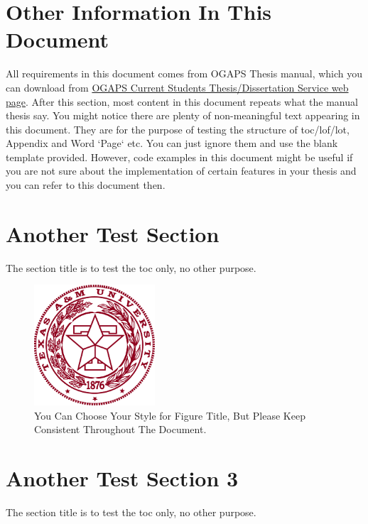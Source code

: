 \section{Other Information In This Document}
All requirements in this document comes from OGAPS Thesis manual, which you can download from \href{http://ogapstest.tamu.edu/New-Current-Students/Thesis-and-Dissertation-Services/Prepare-Your-Document/#0-ResourcesforPreparation}{OGAPS Current Students Thesis/Dissertation Service web page}. After this section, most content in this document repeats what the manual thesis say.  You might notice there are plenty of non-meaningful text appearing in this document. They are for the purpose of testing the structure of toc/lof/lot, Appendix and Word `Page` etc. You can just ignore them and use the blank template provided. However, code examples in this document might be useful if you are not sure about the implementation of certain features in your thesis and you can refer to this document then.
\section{Another Test Section}
The section title is to test the toc only, no other purpose.

 \begin{figure}[!hbp]
\begin{center}
\includegraphics[width=0.4\textwidth]{graphic/logoTAMU.jpg}
\caption[\protect\vspace{-2.8ex}{You Can Choose Your Style for Figure Title, But Please Keep Consistent Throughout The Document.}]{You Can Choose Your Style for Figure Title, But Please Keep Consistent Throughout The Document.}
\label{fig:testExample4}
\end{center}
\end{figure}

\section{Another Test Section 3}
The section title is to test the toc only, no other purpose.

